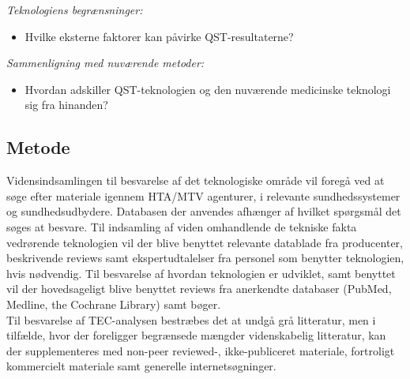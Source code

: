 \textit{Teknologiens begrænsninger:}
\begin{itemize}
\item Hvilke eksterne faktorer kan påvirke QST-resultaterne?
\end{itemize}

\textit{Sammenligning med nuværende metoder:}
\begin{itemize}
\item Hvordan adskiller QST-teknologien og den nuværende medicinske teknologi sig fra hinanden? %
\end{itemize}

\subsection{Metode \citep{HTAcore}}
Vidensindsamlingen til besvarelse af det teknologiske område vil foregå ved at søge efter materiale igennem HTA/MTV agenturer, i relevante sundhedssystemer og sundhedsudbydere. Databasen der anvendes afhænger af hvilket spørgsmål det søges at besvare. Til indsamling af viden omhandlende de tekniske fakta vedrørende teknologien vil der blive benyttet relevante datablade fra producenter, beskrivende reviews samt ekspertudtalelser fra personel som benytter teknologien, hvis nødvendig. Til besvarelse af hvordan teknologien er udviklet, samt benyttet vil der hovedsageligt blive benyttet reviews fra anerkendte databaser (PubMed, Medline, the Cochrane Library) samt bøger.  \\
Til besvarelse af TEC-analysen bestræbes det at undgå grå litteratur, men i tilfælde, hvor der foreligger begrænsede mængder videnskabelig litteratur, kan der supplementeres med non-peer reviewed-, ikke-publiceret materiale, fortroligt kommercielt materiale samt generelle internetsøgninger.